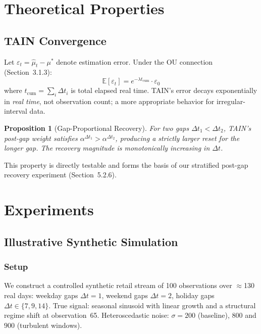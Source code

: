 \documentclass[11pt,a4paper]{article}
\newtheorem{proposition}{Proposition}
\begin{document}
\section{Theoretical Properties}

\subsection{TAIN Convergence}

Let $\varepsilon_t = \hat{\mu}_t - \mu^*$ denote estimation error. Under the OU
connection (Section~3.1.3):
\begin{equation}
  \mathbb{E}[\varepsilon_t] = e^{-\lambda t_\text{cum}} \cdot \varepsilon_0
\end{equation}
where $t_\text{cum} = \sum_i \Delta t_i$ is total elapsed real time. TAIN's error
decays exponentially in \emph{real time}, not observation count; a more
appropriate behavior for irregular-interval data.

\begin{proposition}[Gap-Proportional Recovery]
For two gaps $\Delta t_1 < \Delta t_2$, TAIN's post-gap weight satisfies
$\alpha^{\Delta t_1} > \alpha^{\Delta t_2}$, producing a strictly larger reset
for the longer gap. The recovery magnitude is monotonically increasing in
$\Delta t$.
\end{proposition}

This property is directly testable and forms the basis of our stratified
post-gap recovery experiment (Section~5.2.6).

\section{Experiments}

\subsection{Illustrative Synthetic Simulation}

\subsubsection{Setup}

We construct a controlled synthetic retail stream of 100 observations over
$\approx$130 real days: weekday gaps $\Delta t = 1$, weekend gaps $\Delta t = 2$,
holiday gaps $\Delta t \in \{7, 9, 14\}$. True signal: seasonal sinusoid with
linear growth and a structural regime shift at observation~65. Heteroscedastic
noise: $\sigma = 200$ (baseline), $800$ and $900$ (turbulent windows).
\end{document}
